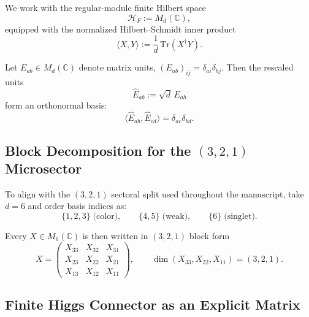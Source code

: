We work with the regular-module finite Hilbert space
\begin{equation}
\mathcal{H}_F := M_d(\mathbb{C}),
\end{equation}
equipped with the normalized Hilbert--Schmidt inner product
\begin{equation}
\langle X, Y \rangle := \frac{1}{d}\,\mathrm{Tr}(X^\dagger Y).
\label{eq:HS_inner}
\end{equation}

Let $E_{ab} \in M_d(\mathbb{C})$ denote matrix units, $(E_{ab})_{ij} = \delta_{ai}\delta_{bj}$.
Then the rescaled units
\begin{equation}
\widehat{E}_{ab} := \sqrt{d}\,E_{ab}
\end{equation}
form an orthonormal basis:
\begin{equation}
\langle \widehat{E}_{ab}, \widehat{E}_{cd} \rangle = \delta_{ac}\delta_{bd}.
\end{equation}

\subsection{Block Decomposition for the $(3,2,1)$ Microsector}

To align with the $(3,2,1)$ sectoral split used throughout the manuscript, take $d=6$ and 
order basis indices as:
\begin{equation}
\{1,2,3\}\;\text{(color)}, \qquad \{4,5\}\;\text{(weak)}, \qquad \{6\}\;\text{(singlet)}.
\end{equation}

Every $X \in M_6(\mathbb{C})$ is then written in $(3,2,1)$ block form
\begin{equation}
X = \begin{pmatrix}
X_{33} & X_{32} & X_{31} \\
X_{23} & X_{22} & X_{21} \\
X_{13} & X_{12} & X_{11}
\end{pmatrix},
\qquad
\dim(X_{33}, X_{22}, X_{11}) = (3, 2, 1).
\end{equation}

\subsection{Finite Higgs Connector as an Explicit Matrix}

